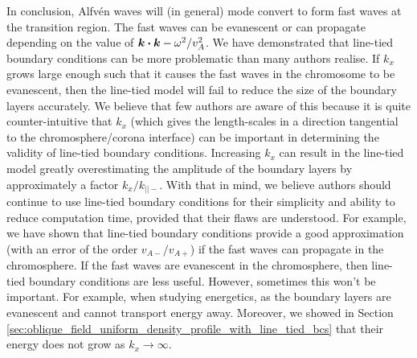 In conclusion, Alfv\'en waves will (in general) mode convert to form fast waves at the transition region. The fast waves can be evanescent or can propagate depending on the value of $\vec{k}\vdot\vec{k} - \omega^2/v_A^2$. We have demonstrated that line-tied boundary conditions can be more problematic than many authors realise. If $k_x$ grows large enough such that it causes the fast waves in the chromosome to be evanescent, then the line-tied model will fail to reduce the size of the boundary layers accurately. We believe that few authors are aware of this because it is quite counter-intuitive that $k_x$ (which gives the length-scales in a direction tangential to the chromosphere/corona interface) can be important in determining the validity of line-tied boundary conditions. Increasing $k_x$ can result in the line-tied model greatly overestimating the amplitude of the boundary layers by approximately a factor $k_x/k_{||-}$. With that in mind, we believe authors should continue to use line-tied boundary conditions for their simplicity and ability to reduce computation time, provided that their flaws are understood. For example, we have shown that line-tied boundary conditions provide a good approximation (with an error of the order $v_{A-}/v_{A+}$) if the fast waves can propagate in the chromosphere. If the fast waves are evanescent in the chromosphere, then line-tied boundary conditions are less useful. However, sometimes this won't be important. For example, when studying energetics, as the boundary layers are evanescent and cannot transport energy away. Moreover, we showed in Section \ref{sec:oblique_field_uniform_density_profile_with_line_tied_bcs} that their energy does not grow as $k_x\rightarrow \infty$.

